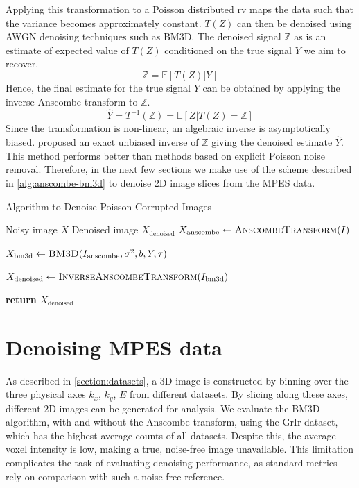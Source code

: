Applying this transformation to a Poisson distributed \gls{rv} maps the data such that the variance becomes approximately constant. $T(Z)$ can then be denoised using \gls{AWGN} denoising techniques such as \gls{BM3D}. 
The denoised signal $\mathbb{Z}$ as is an estimate of expected value of $T(Z)$ conditioned on the true signal $Y$ we aim to recover.
\begin{equation}
    \mathbb{Z} = \mathbb{E}[T(Z) | Y]
\end{equation}
Hence, the final estimate for the true signal $Y$ can be obtained by applying the inverse Anscombe transform to $\mathbb{Z}$.
\begin{equation}
    \hat{Y} = T^{-1}(\mathbb{Z}) = \mathbb{E}[Z | T(Z) = \mathbb{Z}]
\end{equation}
Since the transformation is non-linear, an algebraic inverse is asymptotically biased. \citeauthor{makitaloOptimalInversionAnscombe2011} \cite{makitaloOptimalInversionAnscombe2011} proposed an exact unbiased inverse of $\mathbb{Z}$ giving the denoised estimate $\hat{Y}$. This method performs better than methods based on explicit Poisson noise removal. Therefore, in the next few sections we make use of the scheme described in \cref{alg:anscombe-bm3d} to denoise 2D image slices from the \gls{MPES} data.

\begin{algorithm}
    \caption{Algorithm to Denoise Poisson Corrupted Images}\label{alg:anscombe-bm3d}
    \begin{algorithmic}[1]
    \Require Noisy image $X$
    \Ensure Denoised image $X_{\text{denoised}}$
    \Statex
        \State $X_{\text{anscombe}} \gets \textsc{AnscombeTransform}(I)$
        
        \State $X_{\text{bm3d}} \gets \textsc{BM3D}(I_{\text{anscombe}}, \sigma^2, b, Y, \tau)$
        
        \State $X_{\text{denoised}} \gets \textsc{InverseAnscombeTransform}(I_{\text{bm3d}})$
        
        \State \textbf{return} $X_{\text{denoised}}$
    \EndProcedure
    \end{algorithmic}
\end{algorithm}

\section{Denoising MPES data}
As described in \cref{section:datasets}, a 3D image is constructed by binning over the three physical axes $k_x$, $k_y$, $E$ from different datasets. By slicing along these axes, different 2D images can be generated for analysis. We evaluate the \gls{BM3D} algorithm, with and without the Anscombe transform, using the \gls{GrIr} dataset, which has the highest average counts of all datasets. Despite this, the average voxel intensity is low, making a true, noise-free image unavailable. This limitation complicates the task of evaluating denoising performance, as standard metrics rely on comparison with such a noise-free reference.


